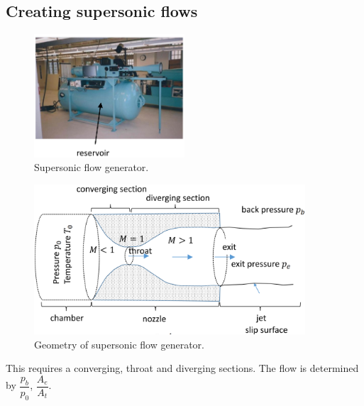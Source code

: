 \documentclass[class=report, crop=false, 12pt,a4paper]{standalone}
\begin{document}
\subsection{Creating supersonic flows}
\begin{figure}[H]
    \centering
    \includegraphics[width = 0.5\textwidth]{../img/diagram53.png}
    \caption{Supersonic flow generator.}
\end{figure}
\begin{figure}[H]
    \centering
    \includegraphics[width = 0.9\textwidth]{../img/diagram54.png}
    \caption{Geometry of supersonic flow generator.}
\end{figure}
This requires a converging, throat and diverging sections. The flow is determined by $\dfrac{p_b}{p_0}$, $\dfrac{A_e}{A_t}$.
\end{document}
